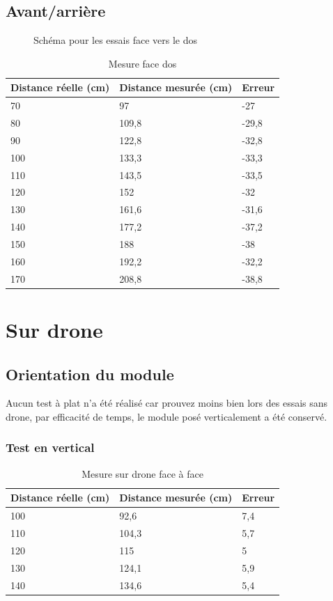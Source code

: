 \documentclass[11pt,a4paper]{article}
\begin{document}
\subsection{Avant/arrière}

\begin{figure}[H]
  \centering
  \FtB
  \caption{Schéma pour les essais face vers le dos}
\end{figure}

\begin{table}[H]
    \centering
    \begin{tabular}{|l|l|l|}
    \hline
        Distance réelle (cm) & Distance mesurée (cm) & Erreur  \\ \hline
        70 & 97 & -27 \\ \hline
        80 & 109,8 & -29,8 \\ \hline
        90 & 122,8 & -32,8 \\ \hline
        100 & 133,3 & -33,3 \\ \hline
        110 & 143,5 & -33,5 \\ \hline
        120 & 152 & -32 \\ \hline
        130 & 161,6 & -31,6 \\ \hline
        140 & 177,2 & -37,2 \\ \hline
        150 & 188 & -38 \\ \hline
        160 & 192,2 & -32,2 \\ \hline
        170 & 208,8 & -38,8 \\ \hline
    \end{tabular}
    \caption{Mesure face dos }
\end{table}

\section{Sur drone}

\subsection{Orientation du module}
Aucun test à plat n'a été réalisé car prouvez moins bien lors des essais sans drone, par efficacité de temps, le module posé verticalement a été conservé. 
\subsubsection{Test en vertical}

\begin{table}[H]
    \centering
    \begin{tabular}{|l|l|l|}
    \hline
        Distance réelle (cm) & Distance mesurée (cm) & Erreur  \\ \hline
        100 & 92,6 & 7,4 \\ \hline
        110 & 104,3 & 5,7 \\ \hline
        120 & 115 & 5 \\ \hline
        130 & 124,1 & 5,9 \\ \hline
        140 & 134,6 & 5,4 \\ \hline
    \end{tabular}
    \caption{Mesure sur drone face à face  }
\end{table}
\end{document}
